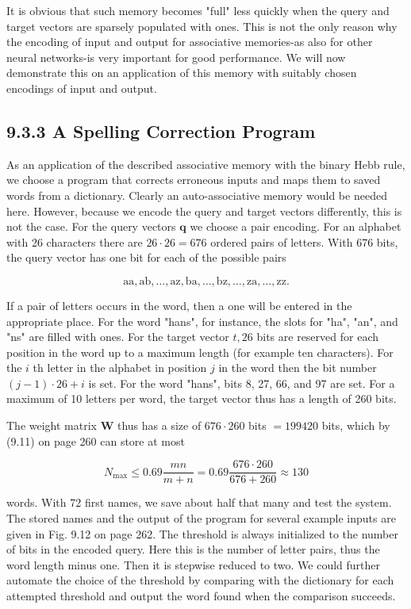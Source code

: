 \documentclass[10pt]{article}
\begin{document}
It is obvious that such memory becomes "full" less quickly when the query and target vectors are sparsely populated with ones. This is not the only reason why the encoding of input and output for associative memories-as also for other neural networks-is very important for good performance. We will now demonstrate this on an application of this memory with suitably chosen encodings of input and output.

\subsection*{9.3.3 A Spelling Correction Program}
As an application of the described associative memory with the binary Hebb rule, we choose a program that corrects erroneous inputs and maps them to saved words from a dictionary. Clearly an auto-associative memory would be needed here. However, because we encode the query and target vectors differently, this is not the case. For the query vectors $\boldsymbol{q}$ we choose a pair encoding. For an alphabet with 26 characters there are $26 \cdot 26=676$ ordered pairs of letters. With 676 bits, the query vector has one bit for each of the possible pairs

$$
\mathrm{aa}, \mathrm{ab}, \ldots, \mathrm{az}, \mathrm{ba}, \ldots, \mathrm{bz}, \ldots, \mathrm{za}, \ldots, \mathrm{zz} .
$$

If a pair of letters occurs in the word, then a one will be entered in the appropriate place. For the word "hans", for instance, the slots for "ha", "an", and "ns" are filled with ones. For the target vector $t, 26$ bits are reserved for each position in the word up to a maximum length (for example ten characters). For the $i$ th letter in the alphabet in position $j$ in the word then the bit number $(j-1) \cdot 26+i$ is set. For the word "hans", bits 8, 27, 66, and 97 are set. For a maximum of 10 letters per word, the target vector thus has a length of 260 bits.

The weight matrix $\boldsymbol{W}$ thus has a size of $676 \cdot 260$ bits $=199420$ bits, which by (9.11) on page 260 can store at most

$$
N_{\max } \leq 0.69 \frac{m n}{m+n}=0.69 \frac{676 \cdot 260}{676+260} \approx 130
$$

words. With 72 first names, we save about half that many and test the system. The stored names and the output of the program for several example inputs are given in Fig. 9.12 on page 262. The threshold is always initialized to the number of bits in the encoded query. Here this is the number of letter pairs, thus the word length minus one. Then it is stepwise reduced to two. We could further automate the choice of the threshold by comparing with the dictionary for each attempted threshold and output the word found when the comparison succeeds.
\end{document}
